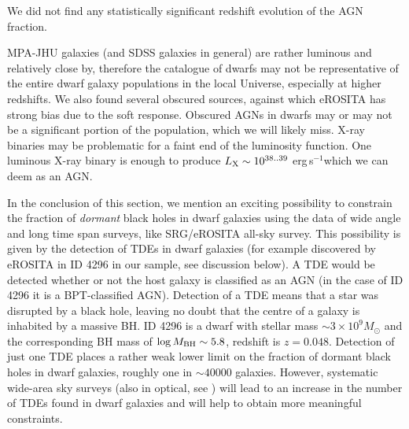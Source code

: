 \documentclass[fleqn,usenatbib]{mnras}
\newcommand{\ergps}{erg\,s$^{-1}$}
\newcommand{\msun}{M_\odot}
\begin{document}
We did not find any statistically significant  redshift evolution of the AGN fraction.  %


 MPA-JHU galaxies (and SDSS galaxies in general) are rather luminous and relatively close by, therefore the catalogue of dwarfs may not be representative of the entire dwarf galaxy populations in the local Universe, especially at higher redshifts.  We also found several obscured sources, against which eROSITA has strong bias due to the soft response. Obscured AGNs in dwarfs may or may not be a significant portion of the population, which we will likely miss. X-ray binaries may be problematic for a faint end of the luminosity function. One luminous X-ray binary is enough to produce $L_{\rm X}\sim10^{38..39}$ \ergps which we can deem as an AGN. 


In the conclusion of this section, we mention an exciting  possibility to constrain the fraction of \textit{dormant} black holes in dwarf galaxies using the data of wide angle and long time span  surveys, like SRG/eROSITA all-sky survey. This possibility is given by the detection of TDEs in dwarf galaxies (for example discovered by eROSITA in ID 4296 in our sample, see discussion below). A TDE would be detected whether or not the host galaxy is classified as an AGN (in the case of ID 4296 it is a BPT-classified AGN). Detection of a TDE means that  a star was disrupted by a black hole, leaving no doubt that the centre of a galaxy is inhabited by a massive BH. ID 4296 is a dwarf with stellar mass $\sim3\times10^9 \msun$ and the corresponding BH mass of $\log M_{\rm BH}\sim5.8$, redshift is $z = 0.048$. Detection of just one TDE places a rather weak lower limit on the fraction of dormant black holes in dwarf galaxies, roughly one in $\sim40000$ galaxies. However, systematic wide-area sky surveys (also in optical, see \citealt{Yao2023}) will lead to an increase in the number of TDEs found in dwarf galaxies and will help to obtain more meaningful constraints.
\end{document}
